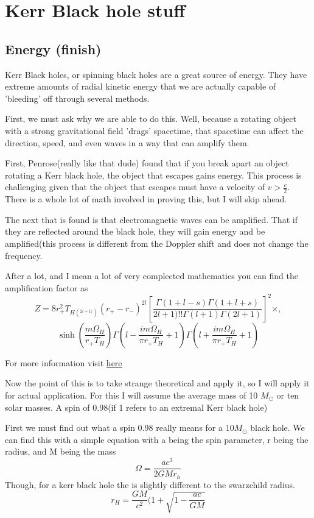 \section{Kerr Black hole stuff}
\subsection{Energy (finish)}
\par Kerr Black holes, or spinning black holes are a great source of energy. They have extreme amounts of radial kinetic energy that we are actually capable of 'bleeding' off through several methods.
\par First, we must ask why we are able to do this. Well, because a rotating object with a strong gravitational field 'drags' spacetime, that spacetime can affect the direction, speed, and even waves in a way that can amplify them.
\par First, Penrose(really like that dude) found that if you break apart an object rotating a Kerr black hole, the object that escapes gains energy. This process is challenging given that the object that escapes must have a velocity of $v>\frac{c}{2}$. There is a whole lot of math involved in proving this, but I will skip ahead.
\par The next that is found is that electromagnetic waves can be amplified. That if they are reflected around the black hole, they will gain energy and be amplified(this process is different from the Doppler shift and does not change the frequency.
\par After a lot, and I mean a lot of very complected mathematics you can find the amplification factor as
$$Z = 8r^2_+T_{H(^{2l+1)}) }(r_+-r_-)^{2l}[\frac{\Gamma(1+l-s)\Gamma(1+l+s)}{2l+1)!!\Gamma(l+1)\Gamma(2l+1)}]^2 \times, $$
$$\sinh(\frac{m \Omega_H}{r_+ T_H})\Gamma(l-\frac{im\Omega_H}{\pi r_+ T_H}+1)\Gamma(l+\frac{im\Omega_H}{\pi r_+ T_H}+1)$$

\par For more information visit 
\href{https://arxiv.org/pdf/1501.06570}{here}

\par Now the point of this is to take strange theoretical and apply it, so I will apply it for actual application. For this I will assume the average mass of 10 $M_\odot $ or ten solar masses. A spin of 0.98(if 1 refers to an extremal Kerr black hole)

\par First we must find out what a spin 0.98 really means for a $10 M_\odot$ black hole. We can find this with a simple equation with a being the spin parameter, r being the radius, and M being the mass
$$\Omega=\frac{ac^3}{2GMr_h}$$
Though, for a kerr black hole the is slightly different to the swarzchild radius.
$$r_H=\frac{GM}{c^2}(1+\sqrt{1-\frac{ac}{GM}}$$


